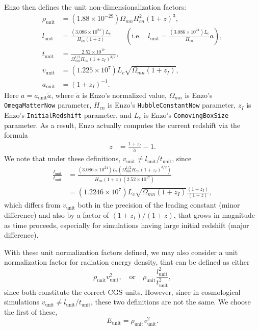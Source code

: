 \documentclass[10pt]{article}
\renewcommand{\(}{\left(}
\renewcommand{\)}{\right)}
\newcommand{\Aunit}{a_{\text{unit}}}
\newcommand{\Lunit}{l_{\text{unit}}}
\newcommand{\Dunit}{\rho_{\text{unit}}}
\newcommand{\Tunit}{t_{\text{unit}}}
\newcommand{\Vunit}{v_{\text{unit}}}
\newcommand{\Eunit}{E_{\text{unit}}}
\newcommand{\tA}{\tilde{a}}
\begin{document}
Enzo then defines the unit non-dimensionalization factors:
\begin{align}
  \label{eq:Dunit}
  \Dunit &= (1.88\times10^{-29}) \Omega_{mn} H_{cn}^2 (1 + z)^3, \\
  \label{eq:Lunit}
  \Lunit &= \frac{(3.086\times10^{24}) L_c}{H_{cn} (1 + z)}
          \qquad \left(\text{i.e.}\quad \Lunit = \frac{(3.086\times10^{24}) L_c}{H_{cn}}a\right), \\
  \label{eq:Tunit}
  \Tunit &= \frac{2.52\times10^{17}}{\Omega_{mn}^{1/2} H_{cn} (1 + z_I)^{3/2}}, \\
  \label{eq:Vunit}
  \Vunit &= (1.225\times10^{7}) L_c \sqrt{\Omega_{mn}(1 + z_I)}, \\
  \label{eq:Aunit}
  \Aunit &= (1+z_I)^{-1}.
\end{align}
Here $a = \Aunit \tA$, where $\tA$ is Enzo's normalized value,  
$\Omega_{mn}$ is Enzo's {\tt OmegaMatterNow} parameter, 
$H_{cn}$ is Enzo's {\tt HubbleConstantNow} parameter, 
$z_I$ is Enzo's {\tt InitialRedshift} parameter, and
$L_c$ is Enzo's {\tt ComovingBoxSize} parameter.
As a result, Enzo actually computes the current redshift via the
formula 
\begin{align}
  \label{eq:CurrentRedshiftFormula}
  z &= \frac{1 + z_I}{\tA} - 1.
\end{align}
We note that under these definitions, $\Vunit \ne \Lunit / \Tunit$, since
\begin{align*}
   \frac{\Lunit}{\Tunit} &= 
   \frac{(3.086\times10^{24}) L_c \left(\Omega_{mn}^{1/2} H_{cn} (1 + z_I)^{3/2}\right)}
         {H_{cn} (1 + z)\left(2.52\times10^{17}\right)} \\
   &= 
   (1.2246\times10^{7}) L_c \sqrt{\Omega_{mn}(1 + z_I)} \frac{(1 + z_I)}{(1 + z)},
\end{align*}
which differs from $\Vunit$ both in the precision of the leading
constant (minor difference) and also by a factor of $(1+z_I)/(1+z)$, that grows
in magnitude as time proceeds, especially for simulations having large
initial redshift (major difference).

With these unit normalization factors defined, we may also consider a
unit normalization factor for radiation energy density, that can be
defined as either 
\[
  \Dunit \Vunit^2, \quad\text{or}\quad 
  \Dunit \frac{\Lunit^2}{\Tunit^2},
\]
since both constitute the correct CGS units.  However, since in
cosmological simulations $\Vunit \ne \Lunit / \Tunit$, these two
definitions are not the same.  We choose the first of these,
\begin{equation}
  \label{eq:Eunit}
  \Eunit = \Dunit \Vunit^2.
\end{equation}
\end{document}
